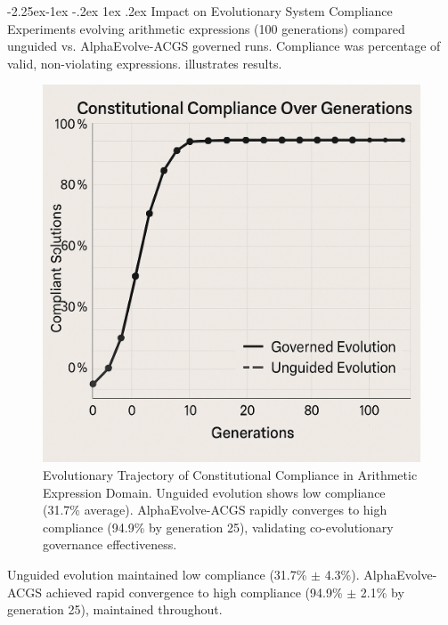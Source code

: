 \documentclass[manuscript,screen,9pt]{acmart}
\makeatletter
\renewcommand\subsection{\@startsection{subsection}{2}{\z@}%
  {-2.25ex\@plus -1ex \@minus -.2ex}%
  {1ex \@plus .2ex}%
  {\normalfont\large\bfseries}}
\makeatother
\begin{document}
\subsection{Impact on Evolutionary System Compliance}
\label{subsec:impact_compliance}
Experiments evolving arithmetic expressions (100 generations) compared unguided vs. AlphaEvolve-ACGS governed runs. Compliance was percentage of valid, non-violating expressions.  illustrates results.
\FloatBarrier %
\begin{figure}[!htb]
\centering
\includegraphics[width=\linewidth,keepaspectratio]{figs/Figure_4_Constitutional_Compliance_Over_Generations.png}
\caption[Evolutionary Trajectory of Constitutional Compliance]{Evolutionary Trajectory of Constitutional Compliance in Arithmetic Expression Domain. Unguided evolution shows low compliance (31.7\% average). AlphaEvolve-ACGS rapidly converges to high compliance (94.9\% by generation 25), validating co-evolutionary governance effectiveness.}
\label{fig:compliance_over_generations}
\end{figure}
Unguided evolution maintained low compliance (31.7\% $\pm$ 4.3\%). AlphaEvolve-ACGS achieved rapid convergence to high compliance (94.9\% $\pm$ 2.1\% by generation 25), maintained throughout.
\end{document}
